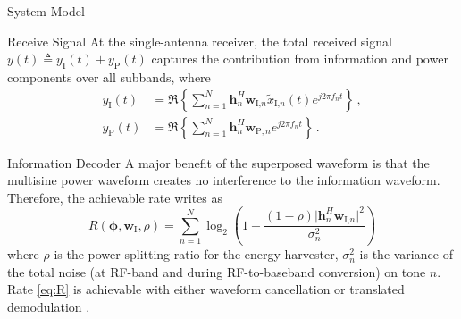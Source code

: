 \documentclass[journal]{IEEEtran}
\begin{document}
\begin{section}{System Model}
		\begin{subsection}{Receive Signal}
			At the single-antenna receiver, the total received signal $y(t) \triangleq y_{\text{I}}(t)+y_\text{P}(t)$ captures the contribution from information and power components over all subbands, where
			\begin{align}
				y_{\text{I}}(t) & = \Re\left\{\sum_{n=1}^N{\boldsymbol{h}_{n}^H}{\boldsymbol{w}_{\text{I,}n}\tilde{x}_{\text{I,}n}(t)}{e^{j2{\pi}{f_n}{t}}}\right\}\,,\label{eq:y_I}\\
				y_{\text{P}}(t) & = \Re\left\{\sum_{n=1}^N{\boldsymbol{h}_{n}^H}\boldsymbol{w}_{\text{P},n}{e^{j2{\pi}{f_n}{t}}}\right\}\,.\label{eq:y_P}
			\end{align}
		\end{subsection}


		\begin{subsection}{Information Decoder}
			A major benefit of the superposed waveform is that the multisine power waveform creates no interference to the information waveform. Therefore, the achievable rate writes as
			\begin{equation}\label{eq:R}
				R(\boldsymbol{\phi},\boldsymbol{w}_{\text{I}},\rho) = \sum_{n=1}^N{\log_2\left(1+\frac{(1-\rho)\lvert \boldsymbol{h}_{n}^H\boldsymbol{w}_{\text{I,}n} \rvert^2}{\sigma_n^2}\right)}
			\end{equation}
			where $\rho$ is the power splitting ratio for the energy harvester, $\sigma_n^2$ is the variance of the total noise (at RF-band and during RF-to-baseband conversion) on tone $n$. Rate \eqref{eq:R} is achievable with either waveform cancellation or translated demodulation \cite{Clerckx2018b}.
		\end{subsection}



\end{section}
\end{document}
